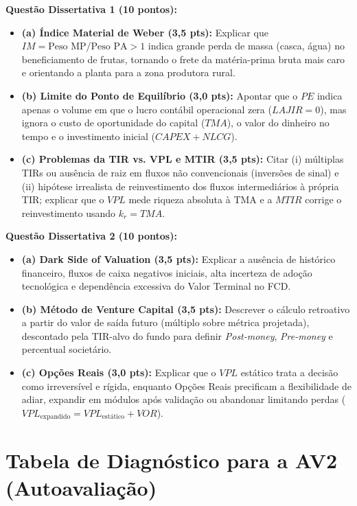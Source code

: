 \begin{boxGabarito}
\textbf{Questão Dissertativa 1 (10 pontos):}
\begin{itemize}[leftmargin=1.4em, itemsep=2pt]
  \item \textbf{(a) Índice Material de Weber (3,5 pts):} Explicar que $IM = \text{Peso MP}/\text{Peso PA} > 1$ indica grande perda de massa (casca, água) no beneficiamento de frutas, tornando o frete da matéria-prima bruta mais caro e orientando a planta para a zona produtora rural.
  \item \textbf{(b) Limite do Ponto de Equilíbrio (3,0 pts):} Apontar que o $PE$ indica apenas o volume em que o lucro contábil operacional zera ($LAJIR = 0$), mas ignora o custo de oportunidade do capital ($TMA$), o valor do dinheiro no tempo e o investimento inicial ($CAPEX + NLCG$).
  \item \textbf{(c) Problemas da TIR vs. VPL e MTIR (3,5 pts):} Citar (i) múltiplas TIRs ou ausência de raiz em fluxos não convencionais (inversões de sinal) e (ii) hipótese irrealista de reinvestimento dos fluxos intermediários à própria TIR; explicar que o $VPL$ mede riqueza absoluta à TMA e a $MTIR$ corrige o reinvestimento usando $k_r = TMA$.
\end{itemize}
\vspace{4pt}
\textbf{Questão Dissertativa 2 (10 pontos):}
\begin{itemize}[leftmargin=1.4em, itemsep=2pt]
  \item \textbf{(a) Dark Side of Valuation (3,5 pts):} Explicar a ausência de histórico financeiro, fluxos de caixa negativos iniciais, alta incerteza de adoção tecnológica e dependência excessiva do Valor Terminal no FCD.
  \item \textbf{(b) Método de Venture Capital (3,5 pts):} Descrever o cálculo retroativo a partir do valor de saída futuro (múltiplo sobre métrica projetada), descontado pela TIR-alvo do fundo para definir \textit{Post-money}, \textit{Pre-money} e percentual societário.
  \item \textbf{(c) Opções Reais (3,0 pts):} Explicar que o $VPL$ estático trata a decisão como irreversível e rígida, enquanto Opções Reais precificam a flexibilidade de adiar, expandir em módulos após validação ou abandonar limitando perdas ($VPL_{\text{expandido}} = VPL_{\text{estático}} + VOR$).
\end{itemize}
\end{boxGabarito}

\section*{Tabela de Diagnóstico para a AV2 (Autoavaliação)}

